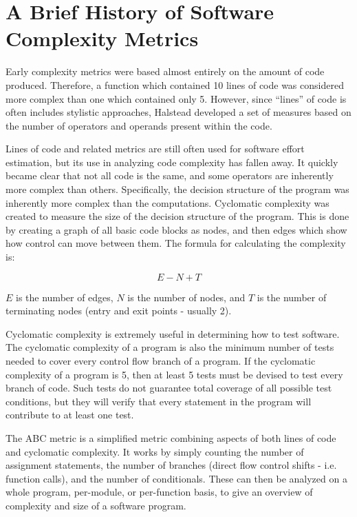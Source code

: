 \section{A Brief History of Software Complexity Metrics}

Early complexity metrics were based almost entirely on the amount of code produced.  Therefore, a function which contained 10 lines of code was considered more complex than one which contained only 5.  However, since ``lines'' of code is often includes stylistic approaches, Halstead developed a set of measures based on the number of operators and operands present within the code.\cite{kearney}  

Lines of code and related metrics are still often used for software effort estimation, but its use in analyzing code complexity has fallen away.  It quickly became clear that not all code is the same, and some operators are inherently more complex than others.  Specifically, the decision structure of the program was inherently more complex than the computations.  Cyclomatic complexity was created to measure the size of the decision structure of the program.\cite{mccabe}  This is done by creating a graph of all basic code blocks as nodes, and then edges which show how control can move between them.  The formula for calculating the complexity is:

$$E - N + T$$

$E$ is the number of edges, $N$ is the number of nodes, and $T$ is the number of terminating nodes (entry and exit points - usually 2).   

Cyclomatic complexity is extremely useful in determining how to test software.  The cyclomatic complexity of a program is also the minimum number of tests needed to cover every control flow branch of a program.  If the cyclomatic complexity of a program is 5, then at least 5 tests must be devised to test every branch of code.  Such tests do not guarantee total coverage of all possible test conditions, but they will verify that every statement in the program will contribute to at least one test.

The ABC metric is a simplified metric combining aspects of both lines of code and cyclomatic complexity.  It works by simply counting the number of assignment statements, the number of branches (direct flow control shifts - i.e. function calls), and the number of conditionals.\cite[pg.~2--3]{fitzpatrick}  These can then be analyzed on a whole program, per-module, or per-function basis, to give an overview of complexity and size of a software program.

